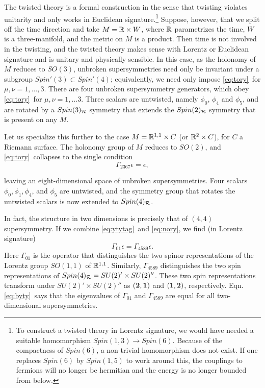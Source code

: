 The twisted theory is a formal construction in the sense that
twisting violates unitarity and only works in Euclidean
signature.\footnote{To construct a twisted theory in Lorentz
signature, we would have needed a suitable homomorphism
$Spin(1,3)\to Spin(6)$.  Because of the compactness of $Spin(6)$,
a non-trivial homomorphism does not exist. If one replaces
$Spin(6)$ by $Spin(1,5)$ to work around this, the couplings to
fermions will no longer be hermitian and the energy is no longer
bounded from below.} Suppose, however, that we split off the time
direction and take $M=\Bbb{R}\times W$, where $\Bbb{R}$
parametrizes the time, $W$ is a three-manifold, and the metric on
$M$ is  a product. Then time is not involved in the twisting, and
the twisted theory makes sense with Lorentz or Euclidean signature
and is unitary and physically sensible. In this case, as the
holonomy of $M$ reduces to $SO(3)$, unbroken supersymmetries need
only be invariant under a subgroup $Spin'(3)\subset Spin'(4)$;
equivalently, we need only impose \eqref{eq:tory}\ for $\mu,\nu=1,\dots,3$.
There are four unbroken supersymmetry generators, which obey
\eqref{eq:tory}\ for $\mu,\nu=1,\dots 3$. Three scalars are untwisted,
namely $\phi_0$, $\phi_4$ and $\phi_5$, and are rotated by a
$Spin(3)_{\cal R}$ symmetry that extends the $Spin(2)_{\cal R}$
symmetry that is present on any $M$.

Let us specialize this further to the case $M=\Bbb{R}^{1,1}\times
C$ (or $\Bbb{R}^2\times C$), for $C$ a Riemann surface.  The
holonomy group of $M$ reduces to $SO(2)$, and \eqref{eq:tory}\ collapses to
the single condition %
\begin{equation*}
\tag*{(5.3)}
\Gamma_{2367}\epsilon=\epsilon,\label{eq:ytytag}
\end{equation*}

leaving an eight-dimensional space of unbroken supersymmetries.
Four scalars $\phi_0,\phi_1,\phi_4$, and $\phi_5$ are untwisted,
and the symmetry group that rotates the untwisted scalars is now
extended to $Spin(4)_{\cal R}$.

In fact, the structure in two dimensions is precisely that of
$(4,4)$ supersymmetry. If we combine \eqref{eq:ytytag}\ and \eqref{eq:nory}, we find (in
Lorentz signature) %
\setcounter{equation}{3}
\begin{equation}\label{eq:byty}
\Gamma_{01}\epsilon
=\Gamma_{4589}\epsilon.
\end{equation}
 Here $\Gamma_{01}$ is the operator that
distinguishes the two spinor representations of the Lorentz group
$SO(1,1)$ of $\Bbb{R}^{1,1}$.
 Similarly, $\Gamma_{4589}$ distinguishes the two spin
representations of $Spin(4)_{\cal R}=SU(2)'\times SU(2)''$. These
two spin representations transform under $SU(2)'\times SU(2)''$ as
$({\bf 2},{\bf 1})$ and $({\bf 1},{\bf 2})$, respectively. Eqn.
\eqref{eq:byty}\ says that the eigenvalues of $\Gamma_{01}$ and
$\Gamma_{4589}$ are equal for all two-dimensional supersymmetries.

